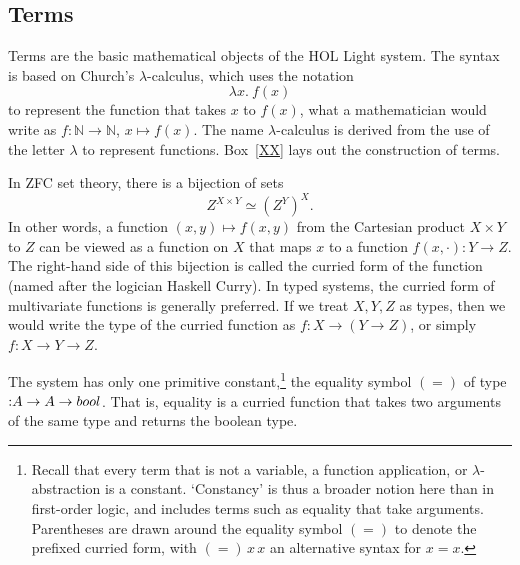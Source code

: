 \documentclass{llncs}
\def\tc{\hbox{:}}
\newcommand{\ring}[1]{\mathbb{#1}}
\begin{document}
\subsection{Terms}

Terms are the basic mathematical objects of the HOL Light system.  The syntax is based
on Church's $\lambda$-calculus, which uses the notation
   $$
   \lambda x.\ f (x)
   $$
to represent the function that takes $x$ to $f(x)$, what a mathematician would write
as $f:\ring{N}\to\ring{N}$, $x\mapsto f(x)$.  The name $\lambda$-calculus is derived
from the use of the letter $\lambda$ to represent functions.  Box~\ref{XX} lays out
the construction of terms.



In ZFC set theory, there is a bijection of sets
  $$
  Z^{X \times Y} \simeq (Z^Y)^X.
  $$
In other words, a function $(x,y)\mapsto f(x,y)$
from the Cartesian product $X \times Y$ to $Z$ can be viewed as a function on
$X$ that maps $x$ to a function $f(x,\cdot):Y\to Z$.  The right-hand side of this
bijection is called the curried form of the function (named after the logician Haskell Curry).  
In typed systems, the curried form of multivariate functions is generally preferred.  If we
treat $X,Y,Z$ as types, then we would write the type of the curried function as
$f:X\to (Y \to Z)$, or simply $f:X\to Y\to Z$.

The system has only one primitive constant,\footnote{Recall that every term that is
not a variable, a function application, or $\lambda$-abstraction is a constant.  `Constancy' is thus a broader notion here than in first-order logic, and includes terms
such as equality that take arguments.  Parentheses are drawn around the
equality symbol $( = )$ to denote the prefixed curried form, with
$( = )\, x\, x$ an alternative syntax for $x = x$.}  
the equality symbol $( = )$
of type $\tc A\to A\to  bool$.  
That is, equality is a curried function that takes two arguments of the same type
and returns the boolean type.
\end{document}
